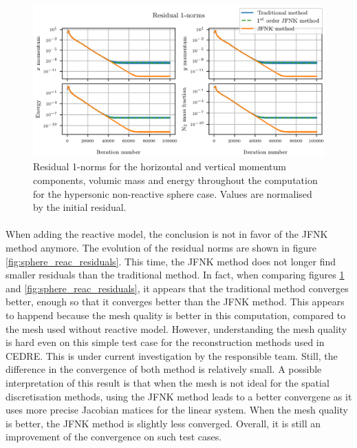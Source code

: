         \begin{figure}
          \centering
          \includegraphics{figures/sphere_residuals.png}
          \caption{Residual 1-norms for the horizontal and vertical momentum components,  volumic mass and energy throughout the computation for the hypersonic non-reactive sphere case.
          Values are normalised by the initial residual.}
          \label{fig:sphere_residuals}
        \end{figure}

        \paragraph{}
        When adding the reactive model, the conclusion is not in favor of the JFNK method anymore.
        The evolution of the residual norms are shown in figure \ref{fig:sphere_reac_residuals}.
        This time, the JFNK method does not longer find smaller residuals than the traditional method.
        In fact, when comparing figures \ref{fig:sphere_residuals} and \ref{fig:sphere_reac_residuals}, it appears that the traditional method converges better, enough so that it converges better than the JFNK method.
        This appears to happend because the mesh quality is better in this computation, compared to the mesh used without reactive model.
        However, understanding the mesh quality is hard even on this simple test case for the reconstruction methods used in CEDRE.
        This is under current investigation by the responsible team.
        Still, the difference in the convergence of both method is relatively small.
        A possible interpretation of this result is that when the mesh is not ideal for the spatial discretisation methods, using the JFNK method leads to a better convergene as it uses more precise Jacobian matices for the linear system.
        When the mesh quality is better, the JFNK method is slightly less converged.
        Overall, it is still an improvement of the convergence on such test cases.

